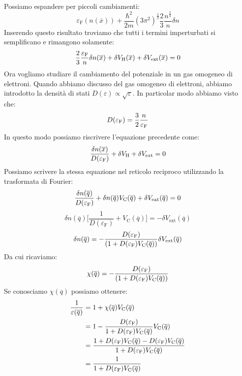 Possiamo espandere per piccoli cambiamenti:
\begin{equation*}
    \varepsilon_{\text{F}}(n(\overline x))+\frac{\hbar^2}{2m}(3\pi^2)^{\frac 23}\frac 23 \frac{n^{\frac 23}}{n}\delta n
\end{equation*}
Inserendo questo risultato troviamo che tutti i termini imperturbati si semplificano e rimangono solamente:
\begin{equation*}
    \frac 23 \frac{\varepsilon_{\text F}}{n}\delta n(\overline x)+\delta V_{\text H}(\overline x)+\delta V_{\text{ext}}(\overline x)=0
\end{equation*}
Ora vogliamo studiare il cambiamento del potenziale in un gas omogeneo di elettroni. Quando abbiamo discusso del gas omogeneo di elettroni, abbiamo introdotto la densità di stati $D(\varepsilon) \propto \sqrt{\varepsilon}$. In particolar modo abbiamo visto che:
\begin{equation*}
    D(\varepsilon_{\text{F}})=\frac 32 \frac n{\varepsilon_{\text F}}
\end{equation*}
In questo modo possiamo riscrivere l'equazione precedente come:
\begin{equation*}
    \frac{\delta n(\overline x)}{D(\varepsilon_{\text F})}+\delta V_{\text H}+\delta V_{\text{ext}}=0
\end{equation*}
Possiamo scrivere la stessa equazione nel reticolo reciproco utilizzando la trasformata di Fourier:
\begin{equation*}
    \frac{\delta n(\overline q)}{D(\varepsilon_{\text F})}+\delta n(\overline q)V_{\text C}(\overline q)+\delta V_{\text{ext}}(\overline q)=0
\end{equation*}
\begin{equation*}
    \delta n(\overline q)\Bigg[\frac{1}{D(\varepsilon_{\text{F}})}+V_{\text{C}}(\overline q)\Bigg]=-\delta V_{\text{ext}}(\overline q)
\end{equation*}
\begin{equation*}
    \delta n(\overline q)= -\frac{D(\varepsilon_{\text F})}{(1+D(\varepsilon_{\text{F}})V_{\text{C}}(\overline q))}\delta V_{\text{ext}}(\overline q)
\end{equation*}
Da cui ricaviamo:
\begin{equation*}
    \chi(\overline q)=-\frac{D(\varepsilon_{\text F})}{(1+D(\varepsilon_{\text{F}})V_{\text{C}}(\overline q))}
\end{equation*}
Se conosciamo $\chi(\overline q)$ possiamo ottenere:
\begin{equation*}
    \begin{aligned}
        \frac{1}{\varepsilon(\overline q)} &=1+\chi(\overline q)V_{\text{C}}(\overline q) \\
        & = 1-\frac{D(\varepsilon_{\text F})}{1+D(\varepsilon_{\text F})V_{\text C}(\overline q)}V_{\text C}(\overline q) \\
        & = \frac{1+D(\varepsilon_{\text F})V_{\text C}(\overline q)- D(\varepsilon_{\text F})V_{\text{C}}(\overline q)}{1+D(\varepsilon_{\text F})V_{\text{C}}(\overline q)} \\
        & = \frac{1}{1+D(\varepsilon_{\text F})V_{\text{C}}(\overline q)}
    \end{aligned}
\end{equation*}
